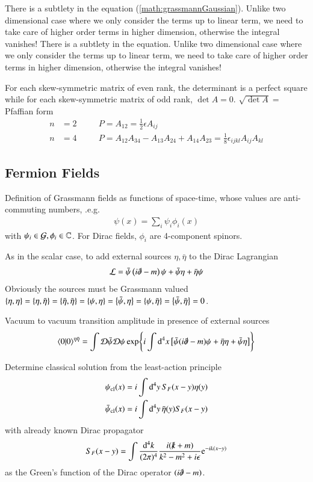 There is a subtlety in the equation (\ref{math:grassmannGaussian}). Unlike two dimensional case where we only consider the terms up to linear term, we need to take care of higher order terms in higher dimension, otherwise the integral vanishes!
There is a subtlety in the equation. Unlike two dimensional case where we only consider the terms up to linear term, we need to take care of higher order terms in higher dimension, otherwise the integral vanishes!

For each skew-symmetric matrix of even rank, the determinant is a perfect square while for each skew-symmetric matrix of odd rank, $\det{A} = 0$. $\sqrt{\det{A}}=$ Pfaffian form
\begin{align*}
   n&=2 \quad &&P = A_{12} = \frac{1}{2}\epsilon A_{ij} \\
   n&=4 \quad &&P = A_{12}A_{34} - A_{13}A_{24} + A_{14}A_{23} = \frac{1}{8}\epsilon_{ijkl} A_{ij}A_{kl}
\end{align*}

\subsection{Fermion Fields}
Definition of Grassmann fields as functions of space-time, whose values are anti-commuting numbers, .e.g.
\begin{align}
   \psi (x) = \sum_i \psi_i \phi_i (x) 
\end{align} 
with $\psi_i \in \mathcal{G}, \phi_i \in \mathbb{C}$. For Dirac fields, $\phi_i$ are 4-component spinors.

As in the scalar case, to add external sources $\eta, \bar{\eta}$ to the Dirac Lagrangian
\begin{align}
   \mathcal{L} = \bar{\psi} \left( i\slashed{\partial} - m \right)\psi + \bar\psi \eta + \bar{\eta} \psi
\end{align}
Obviously the sources must be Grassmann valued $\acomm{\eta}{\eta} = \acomm{\eta}{\bar{\eta}} = \acomm{\bar{\eta}}{\bar{\eta}} = \acomm{\psi}{\eta} = \acomm{\bar\psi}{\eta} = \acomm{\psi}{\bar\eta} = \acomm{\bar\psi}{\bar\eta} = 0$. 

Vacuum to vacuum transition amplitude in presence of external sources
\begin{align}
   \braket{0|0}^{\eta\bar{\eta}} = \int \mathcal{D} \bar{\psi} \mathcal{D} \psi \exp{i\int \dd[4]{x} \left[ \bar{\psi} (i\slashed{\partial} - m)\psi + \bar{\eta}\eta + \bar{\psi} \eta \right]}
\end{align}

Determine classical solution from the least-action principle
\begin{align}
   \psi_{\text{cl}} (x) = i \int \dd[4]{y} S_F(x-y) \eta(y) \\
   \bar\psi_{\text{cl}} (x) = i \int \dd[4]{y} \bar\eta(y)S_F(x-y)  
\end{align}
with already known Dirac propagator
\begin{align}
   S_F(x-y) = \int \frac{\dd[4]{k}}{(2\pi)^4} \frac{i(\slashed{k}+m)}{k^2 - m^2 +i\epsilon} \mathrm{e}^{-ik(x-y)}
\end{align}
as the Green's function of the Dirac operator $(i\slashed{\partial} - m)$.

